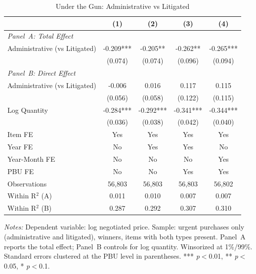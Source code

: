 \begin{table}[ht]
  \centering
  \caption{Under the Gun: Administrative vs Litigated}
  \label{tab:underthegun}
  \small
  \begin{threeparttable}
  \begin{tabular}{lcccc}
    \hline\hline
    & (1) & (2) & (3) & (4) \\
    \hline
    \multicolumn{5}{l}{\textit{Panel~A: Total Effect}} \\[3pt]
    Administrative (vs Litigated) & -0.209*** & -0.205** & -0.262** & -0.265*** \\
     & (0.074) & (0.074) & (0.096) & (0.094) \\[3pt]
    \hline
    \multicolumn{5}{l}{\textit{Panel~B: Direct Effect}} \\[3pt]
    Administrative (vs Litigated) & -0.006 & 0.016 & 0.117 & 0.115 \\
     & (0.056) & (0.058) & (0.122) & (0.115) \\[3pt]
    Log Quantity & -0.284*** & -0.292*** & -0.341*** & -0.344*** \\
     & (0.036) & (0.038) & (0.042) & (0.040) \\[3pt]
    \hline
    Item FE & Yes & Yes & Yes & Yes \\
    Year FE & No & Yes & Yes & No \\
    Year-Month FE & No & No & No & Yes \\
    PBU FE & No & No & Yes & Yes \\
    Observations & 56,803 & 56,803 & 56,803 & 56,802 \\
    Within R$^2$ (A) & 0.011 & 0.010 & 0.007 & 0.007 \\
    Within R$^2$ (B) & 0.287 & 0.292 & 0.307 & 0.310 \\
    \hline\hline
  \end{tabular}
  \begin{tablenotes}
    \small
    \item \textit{Notes:} Dependent variable: log negotiated price. Sample: urgent purchases only (administrative and litigated), winners, items with both types present. Panel~A reports the total effect; Panel~B controls for log quantity. Winsorized at 1\%/99\%. Standard errors clustered at the PBU level in parentheses. *** \textit{p}$<$0.01, ** \textit{p}$<$0.05, * \textit{p}$<$0.1.
  \end{tablenotes}
  \end{threeparttable}
\end{table}

